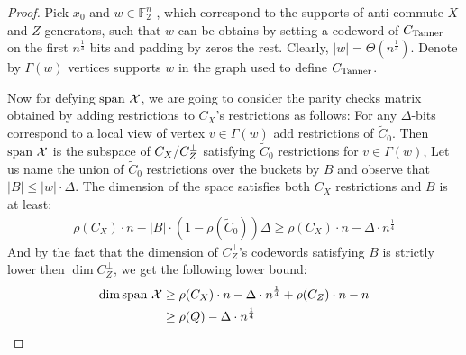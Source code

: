\documentclass[manuscript,screen,review]{acmart}
\begin{document}
\begin{proof}
  Pick $x_{0}$ and $w \in \mathbb{F}_{2}^{n}$ , which correspond to the supports of anti commute $X$ and $Z$ generators, such that $w$ can be obtains by setting a codeword of $C_{\text{Tanner}}$ on the first $n^{\frac{1}{4}}$ bits and padding by zeros the rest. Clearly, $|w| = \Theta(n^{\frac{1}{4}})$. Denote by $\Gamma(w)$ vertices supports $w$ in the graph used to define $C_{\text{Tanner}}$.  

  Now for defying $\text{span }\mathcal{X}$, we are going to consider the parity checks matrix obtained by adding restrictions to $C_{X}$'s restrictions as follows: For any $\Delta$-bits correspond to a local view of vertex $v \in \Gamma(w)$ add restrictions of $\tilde{C}_{0}$. Then $\text{span }\mathcal{X}$ is the subspace of $C_{X}/C_{Z}^\perp$ satisfying $\tilde{C}_{0}$ restrictions for $v \in \Gamma(w)$, Let us name the union of $\tilde{C}_{0}$ restrictions over the buckets by $B$ and observe that $|B| \le |w| \cdot \Delta$. The dimension of the space satisfies both $C_{X}$ restrictions and $B$ is at least:
  \begin{equation*}
    \begin{split}
      \rho(C_{X})\cdot n - |B|\cdot (1 - \rho(\tilde{C}_{0}))\Delta \ge \rho(C_{X})\cdot n - \Delta \cdot n^{\frac{1}{4}}
    \end{split}
  \end{equation*}
  And by the fact that the dimension of $C_{Z}^\perp$'s codewords satisfying $B$ is strictly lower then $\dim C_{Z}^\perp$, we get the following lower bound:
  \begin{equation*}
    \begin{split}
      \dim \text{span } \mathcal{X} & \ge \rho(C_{X})\cdot n - \Delta \cdot n^{\frac{1}{4}} + \rho(C_{Z})\cdot n - n \\
     & \ge \rho (Q) - \Delta \cdot n^{\frac{1}{4}}
    \end{split}
  \end{equation*}
\end{proof}
\end{document}
